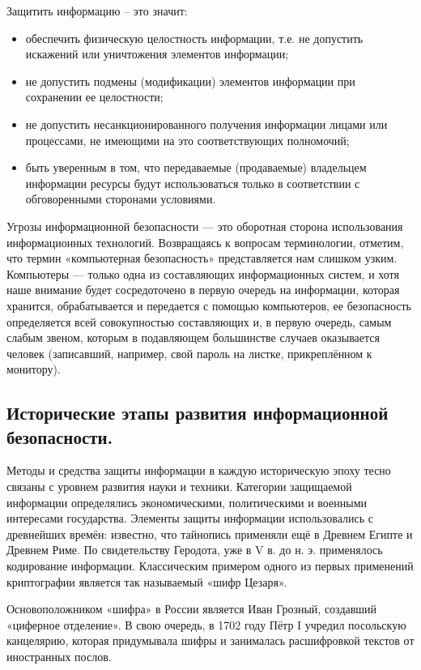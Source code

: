Защитить информацию – это значит:
\begin{itemize}
    \item обеспечить физическую целостность информации, т.е. не допустить искажений или уничтожения элементов информации;
    \item не допустить подмены (модификации) элементов информации при сохранении ее целостности;
    \item не допустить несанкционированного получения информации лицами или процессами, не имеющими на это соответствующих 
    полномочий;
    \item быть уверенным в том, что передаваемые (продаваемые) владельцем информации ресурсы будут использоваться только в 
    соответствии с обговоренными сторонами условиями.
\end{itemize}

Угрозы информационной безопасности — это оборотная сторона использования информационных технологий. Возвращаясь к вопросам 
терминологии, отметим, что термин «компьютерная безопасность» представляется нам слишком узким. Компьютеры — только одна из 
составляющих информационных систем, и хотя наше внимание будет сосредоточено в первую очередь на информации, которая 
хранится, обрабатывается и передается с помощью компьютеров, ее безопасность определяется всей совокупностью составляющих и, 
в первую очередь, самым слабым звеном, которым в подавляющем большинстве случаев оказывается человек (записавший, например, 
свой пароль на листке, прикреплённом к монитору). 
\newpage
\subsection{Исторические этапы развития информационной безопасности.}
Методы и средства защиты информации в каждую историческую эпоху тесно связаны с уровнем развития науки и техники. Категории 
защищаемой информации определялись экономическими, политическими и военными интересами государства. Элементы защиты 
информации использовались с древнейших времён: известно, что тайнопись применяли ещё в Древнем Египте и Древнем Риме. По 
свидетельству Геродота, уже в V в. до н. э. применялось кодирование информации. Классическим примером одного из первых 
применений криптографии является так называемый «шифр Цезаря».

Основоположником «шифра» в России является Иван Грозный, создавший «циферное отделение». В свою очередь, в 1702 году Пётр I 
учредил посольскую канцелярию, которая придумывала шифры и занималась расшифровкой текстов от иностранных послов.

